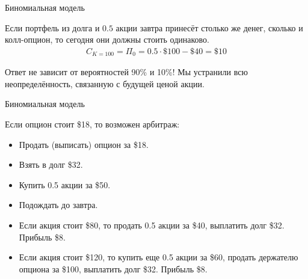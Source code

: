 \documentclass{beamer}
\begin{document}
\begin{frame}{Биномиальная модель}
\centering
{}

\justify
Если портфель из долга и $0.5$ акции \alert{завтра} принесёт столько же денег, сколько и колл-опцион, то \alert{сегодня} они должны стоить одинаково.
\begin{align*}
C_{K=100} = \Pi_0 = 0.5 \cdot \$100 - \$40 = \$10
\end{align*}

Ответ не зависит от вероятностей 90\% и 10\%! Мы устранили всю неопределённость, связанную с будущей ценой акции.
\end{frame}



\begin{frame}{Биномиальная модель}
\centering
{}

\justify
Если опцион стоит \$18, то возможен арбитраж:
\begin{itemize}
\item Продать (выписать) опцион за \$18.
\item Взять в долг \$32.
\item Купить 0.5 акции за \$50.
\item Подождать до завтра.
\item Если акция стоит \$80, то продать 0.5 акции за \$40, выплатить долг \$32. Прибыль \$8.
\item Если акция стоит \$120, то купить еще 0.5 акции за \$60, продать держателю опциона за \$100, выплатить долг \$32. Прибыль \$8.
\end{itemize}
\end{frame}
\end{document}
